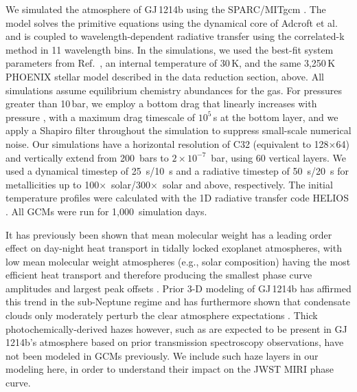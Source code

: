 \documentclass[pdflatex,sn-standardnature]{sn-jnl}%
\begin{document}
We simulated the atmosphere of GJ\,1214b using the SPARC/MITgcm \citep{showman09,kataria13}. The model solves the primitive equations using the dynamical core of Adcroft et al. \citep{adcroft04} and is coupled to wavelength-dependent radiative transfer \citep{marley1999} using the correlated-k method in 11 wavelength bins.
In the simulations, we used the best-fit system parameters from Ref.~\cite{cloutier21}, an internal temperature of 30\,K, and the same 3,250\,K PHOENIX stellar model described in the data reduction section, above. 
All simulations assume equilibrium chemistry abundances for the gas. For pressures greater than 10\,bar, we employ a bottom drag that linearly increases with pressure \citep{liu13}, with a maximum drag timescale of $10^{5}$\,s at the bottom layer, and we apply a Shapiro filter throughout the simulation to suppress small-scale numerical noise. Our simulations have a horizontal resolution of C32 (equivalent to 128$\times$64) and vertically extend from 200~bars to $2\times 10^{-7}$~bar, using 60 vertical layers. We used a dynamical timestep of 25~s/10~s and a radiative timestep of 50~s/20~s for metallicities up to 100$\times$~solar/300$\times$~solar and above, respectively. The initial temperature profiles were calculated with the 1D radiative transfer code HELIOS \cite{malik17,malik19}.  All GCMs were run for 1,000~simulation days. 

It has previously been shown that mean molecular weight has a leading order effect on day-night heat transport in tidally locked exoplanet atmospheres, with low mean molecular weight atmospheres (e.g., solar composition) having the most efficient heat transport and therefore producing the smallest phase curve amplitudes and largest peak offsets \cite{zhang17}. Prior 3-D modeling of GJ\,1214b has affirmed this trend in the sub-Neptune regime \cite{kataria14} and has furthermore shown that condensate clouds only moderately perturb the clear atmosphere expectations \cite{charnay15b,charnay15,christie22}.  Thick photochemically-derived hazes however, such as are expected to be present in GJ\,1214b's atmosphere based on prior transmission spectroscopy observations, have not been modeled in GCMs previously.  We include such haze layers in our modeling here, in order to understand their impact on the JWST MIRI phase curve. 
\end{document}
